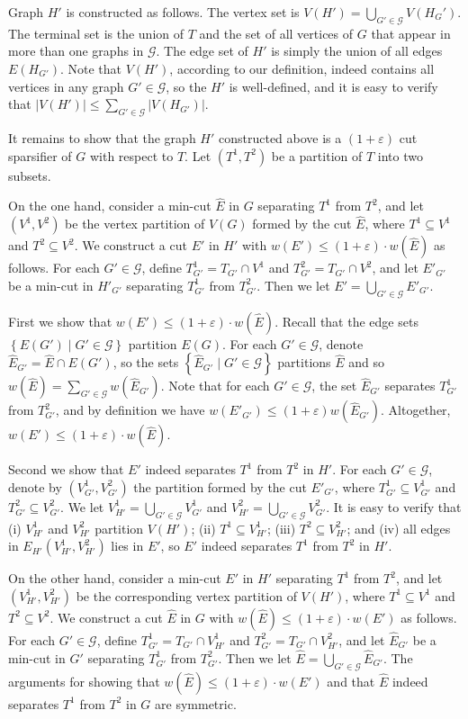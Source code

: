 \documentclass[11pt]{article}
\theoremstyle{definition}
\newcommand{\set}[1]{\left\{ #1 \right\}}
\newcommand{\gset}{{\mathcal{G}}}
\newcommand{\eps}{{\varepsilon}}
\newcounter{note}
\begin{document}
Graph $H'$ is constructed as follows. The vertex set is $V(H')=\bigcup_{G'\in \gset}V(H_G')$. The terminal set is the union of $T$ and the set of all vertices of $G$ that appear in more than one graphs in $\gset$. The edge set of $H'$ is simply the union of all edges $E(H_{G'})$. Note that $V(H')$, according to our definition, indeed contains all vertices in any graph $G'\in \gset$, so the $H'$ is well-defined, and it is easy to verify that $|V(H')|\le \sum_{G'\in \gset}|V(H_{G'})|$.

It remains to show that the graph $H'$ constructed above is a $(1+\eps)$ cut sparsifier of $G$ with respect to $T$. Let $(T^1,T^2)$ be a partition of $T$ into two subsets.

On the one hand, consider a min-cut $\hat E$ in $G$ separating $T^1$ from $T^2$, and let $(V^1,V^2)$ be the vertex partition of $V(G)$ formed by the cut $\hat E$, where $T^1\subseteq V^1$ and $T^2\subseteq V^2$. We construct a cut $E'$ in $H'$ with $w(E')\le (1+\eps)\cdot w(\hat E)$ as follows. 
For each $G'\in \gset$, define $T^1_{G'}=T_{G'}\cap V^1$ and $T^2_{G'}=T_{G'}\cap V^2$, and let $E'_{G'}$ be a min-cut in $H'_{G'}$ separating $T^1_{G'}$ from $T^2_{G'}$. 
Then we let $E'=\bigcup_{G'\in \gset}E'_{G'}$.

First we show that $w(E')\le (1+\eps)\cdot w(\hat E)$.
Recall that the edge sets $\set{E(G')\mid G'\in \gset}$ partition $E(G)$. For each $G'\in \gset$, denote $\hat E_{G'}=\hat E\cap E(G')$, so the sets $\set{\hat E_{G'} \mid G'\in \gset}$ partitions $\hat E$ and so $w(\hat E)=\sum_{G'\in \gset}w(\hat E_{G'})$.
Note that for each $G'\in \gset$, the set $\hat E_{G'}$ separates $T^1_{G'}$ from $T^2_{G'}$, and by definition we have $w(E'_{G'})\le (1+\eps) w(\hat E_{G'})$. Altogether, $w(E')\le (1+\eps)\cdot w(\hat E)$.

Second we show that $E'$ indeed separates $T^1$ from $T^2$ in $H'$. For each $G'\in \gset$, denote by $(V^1_{G'},V^2_{G'})$ the partition formed by the cut $E'_{G'}$, where $T^1_{G'}\subseteq V^1_{G'}$ and $T^2_{G'}\subseteq V^2_{G'}$. We let $V^1_{H'}=\bigcup_{G'\in \gset}V^1_{G'}$ and $V^2_{H'}=\bigcup_{G'\in \gset}V^2_{G'}$.
It is easy to verify that (i) $V^1_{H'}$ and $V^2_{H'}$ partition $V(H')$; (ii) $T^1\subseteq V^1_{H'}$; (iii) $T^2\subseteq V^2_{H'}$; and (iv) all edges in $E_{H'}(V^1_{H'},V^2_{H'})$ lies in $E'$, so $E'$ indeed separates $T^1$ from $T^2$ in $H'$.

On the other hand, consider a min-cut $E'$ in $H'$ separating $T^1$ from $T^2$, and let $(V_{H'}^1,V_{H'}^2)$ be the corresponding vertex partition of $V(H')$, where $T^1\subseteq V^1$ and $T^2\subseteq V^2$. 
We construct a cut $\hat E$ in $G$ with $w(\hat E)\le (1+\eps)\cdot w(E')$ as follows. 
For each $G'\in \gset$, define $T^1_{G'}=T_{G'}\cap V^1_{H'}$ and $T^2_{G'}=T_{G'}\cap V^2_{H'}$, and let $\hat E_{G'}$ be a min-cut in $G'$ separating $T^1_{G'}$ from $T^2_{G'}$. 
Then we let $\hat E=\bigcup_{G'\in \gset}\hat E_{G'}$.
The arguments for showing that $w(\hat E)\le (1+\eps)\cdot w(E')$ and that $\hat E$ indeed separates $T^1$ from $T^2$ in $G$ are symmetric.
\end{document}
